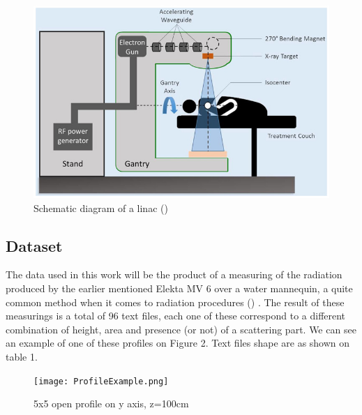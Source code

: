 \documentclass[openany]{article}
\begin{document}
\begin{figure}[!h]
    \centering
    \includegraphics[width=\textwidth]{fcvm-07-00108-g0003.jpg}
    \caption{Schematic diagram of a linac (\cite{Jumeau})}
    \label{fig:my_label}
\end{figure}





\subsection{Dataset}

The data used in this work will be the product of a measuring of the radiation produced by the earlier mentioned Elekta MV 6 over a water mannequin, a quite common method when it comes to radiation procedures (\cite{Lutz1984-ex, BenitesR2012, Gonzalez2015, Tessonnier}) . The result of these measurings is a total of 96 text files, each one of these correspond to a different combination of height, area and presence (or not) of a scattering part. We can see an example of one of these profiles on Figure 2. Text files shape are as shown on table 1.


\begin{figure}[!h]
    \centering
    \texttt{[image: ProfileExample.png]}
    \caption{5x5 open profile on y axis, z=100cm}
    \label{fig:my_label}
\end{figure}
\end{document}
